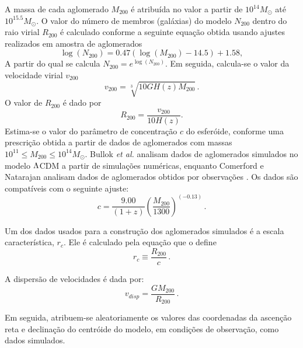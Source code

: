 \documentclass[a4paper]{report}
\begin{document}
A massa de cada aglomerado $M_{200}$ \'e atribu\'ida no valor a partir de $10^{14} M_{\odot}$ at\'e $10^{15.5}M_{\odot}$. O valor do n\'umero de membros (gal\'axias) do modelo $N_{200}$ dentro do raio virial $R_{200}$ \'e calculado conforme a seguinte equa\c c\~ao obtida usando ajustes realizados em amostra de aglomerados\cite{andreon2012}
\begin{equation}
\log(N_{200}) = 0.47(\log(M_{200}) - 14.5) + 1.58,
\label{andreon}	
\end{equation}	
A partir do qual se calcula $N_{200} = e^{\log(N_{200})}$. Em seguida, calcula-se o valor da velocidade virial $v_{200}$\cite{springel1999}
\begin{equation}
v_{200} = \sqrt[3]{10GH(z)M_{200}} \, .
\label{velocidadevirial}
\end{equation}	
O valor de $R_{200}$ \'e dado por 
\begin{equation} R_{200} = \frac{v_{200}}{10H(z)}.
\label{rvirial}
\end{equation}
Estima-se o valor do par\^ametro de concentra\c c\~ao $c$ do esfer\'oide, conforme uma prescri\c c\~ao obtida a partir de dados de aglomerados com massas $10^{11} \leq M_{200} \leq 10^{14} M_{\odot}$\cite{Bullock}.  Bullok {\it et al.} analisam dados de aglomerados simulados no modelo ${\rm \Lambda}$CDM\cite{Bullock} a partir de simula\c c\~oes num\'ericas, enquanto Comerford e Natarajan analisam dados de aglomerados obtidos por observa\c c\~oes \cite{COMERFORD}. Os dados s\~ao compat\'iveis com o seguinte ajuste:
\begin{equation}
c = \frac{9.00}{(1+z)} \left(\frac{M_{200}}{1300}\right)^{(-0.13)} \, .	
\label{cparameter}
\end{equation}

Um dos dados usados para a constru\c c\~ao dos aglomerados simulados \'e a escala caracter\'istica, $r_c$. Ele \'e calculado pela equa\c c\~ao que o define
\begin{equation}
r_c \equiv \frac{R_{200}}{c} \, .
\label{rc}
\end{equation}	

A dispers\~ao de velocidades \'e dada por:
\begin{equation}
v_{disp} = \frac{GM_{200}}{R_{200}} \, .	
\label{vdisp}
\end{equation}
	
Em seguida, atribuem-se aleatoriamente os valores das coordenadas da ascen\c c\~ao reta e declina\c c\~ao do centr\'oide do modelo, em condi\c c\~oes de observa\c c\~ao, como dados simulados. 
\end{document}
